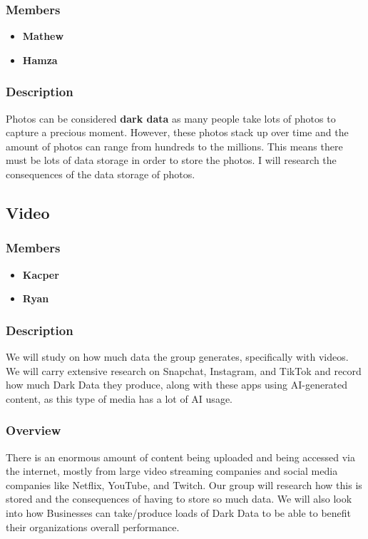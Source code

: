 \documentclass{article}
\begin{document}
        \subsubsection{Members}
        \begin{itemize}
            \item \textbf{Mathew}
            \item \textbf{Hamza}
        \end{itemize}
        \subsubsection{Description}
        Photos can be considered \textbf{dark data} as many people take lots of photos to capture a precious moment. However, these photos stack up over time and the amount of photos can range from hundreds to the millions. This means there must be lots of data storage in order to store the photos.
        I will research the consequences of the data storage of photos.

    \subsection{Video}
        \subsubsection{Members}
        \begin{itemize}
            \item \textbf{Kacper}
            \item \textbf{Ryan}
        \end{itemize}
        \subsubsection{Description}
        We will study on how much data the group generates, specifically with videos. We will carry extensive research on Snapchat, Instagram, and TikTok and record how much Dark Data they produce, along with these apps using AI-generated content, as this type of media has a lot of AI usage.

        \subsubsection{Overview}
        There is an enormous amount of content being uploaded and being accessed via the internet, mostly from large video 
        streaming companies and social media companies like Netflix, YouTube, and Twitch. Our group will research
        how this is stored and the consequences of having to store so much data. We will also look into how Businesses can
        take/produce loads of Dark Data to be able to benefit their organizations overall performance.
\end{document}
